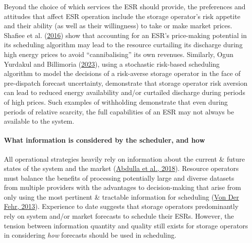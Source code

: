 \documentclass[12pt,a4paper,]{report}
\begin{document}
Beyond the choice of which services the ESR should provide, the
preferences and attitudes that affect ESR operation include the storage
operator's risk appetite and their ability (as well as their
willingness) to take or make market prices. Shafiee et al.
(\protect\hyperlink{ref-shafieeEconomicAssessmentPricemaker2016}{2016})
show that accounting for an ESR's price-making potential in its
scheduling algorithm may lead to the resource curtailing its discharge
during high energy prices to avoid ``cannibalising'' its own revenues.
Similarly, Ogun Yurdakul and Billimoria
(\protect\hyperlink{ref-yurdakulRiskAverseSelfSchedulingStorage2023}{2023}),
using a stochastic risk-based scheduling algorithm to model the
decisions of a risk-averse storage operator in the face of pre-dispatch
forecast uncertainty, demonstrate that storage operator risk aversion
can lead to reduced energy availability and/or curtailed discharge
during periods of high prices. Such examples of withholding demonstrate
that even during periods of relative scarcity, the full capabilities of
an ESR may not always be available to the system.

\hypertarget{sec:info-context-esr-operation-information}{%
\paragraph{What information is considered by the scheduler, and
how}\label{sec:info-context-esr-operation-information}}

All operational strategies heavily rely on information about the current
\& future states of the system and the market
(\protect\hyperlink{ref-abdullaOptimalOperationEnergy2018}{Abdulla et
al., 2018}). Resource operators must balance the benefits of processing
potentially large and diverse datasets from multiple providers with the
advantages to decision-making that arise from only using the most
pertinent \& tractable information for scheduling
(\protect\hyperlink{ref-vonderfehrTransparencyElectricityMarkets2013}{Von
Der Fehr, 2013}). Experience to date suggests that storage operators
predominantly rely on system and/or market forecasts to schedule their
ESRs. However, the tension between information quantity and quality
still exists for storage operators in considering \emph{how} forecasts
should be used in scheduling.
\end{document}
